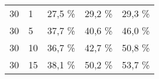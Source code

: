 \begin{table}[!htb]
\begin{tabular}{lllll}
                                                                             &                                                                                        &                                                                                                                       &                                                                                                                        &                                                                                                                        \\ \hline
\multicolumn{1}{|l|}{30}                                                     & \multicolumn{1}{l|}{1}                                                                 & \multicolumn{1}{l|}{27,5 \%}                                                                                           & \multicolumn{1}{l|}{29,2 \%}                                                                                            & \multicolumn{1}{l|}{29,3 \%}                                                                                            \\ \hline
\multicolumn{1}{|l|}{30}                                                     & \multicolumn{1}{l|}{5}                                                                 & \multicolumn{1}{l|}{37,7 \%}                                                                                           & \multicolumn{1}{l|}{40,6 \%}                                                                                            & \multicolumn{1}{l|}{46,0 \%}                                                                                            \\ \hline
\multicolumn{1}{|l|}{30}                                                     & \multicolumn{1}{l|}{10}                                                                & \multicolumn{1}{l|}{36,7 \%}                                                                                           & \multicolumn{1}{l|}{42,7 \%}                                                                                            & \multicolumn{1}{l|}{50,8 \%}                                                                                            \\ \hline
\multicolumn{1}{|l|}{30}                                                     & \multicolumn{1}{l|}{15}                                                                & \multicolumn{1}{l|}{38,1 \%}                                                                                           & \multicolumn{1}{l|}{50,2 \%}                                                                                            & \multicolumn{1}{l|}{53,7 \%}                                                                                            \\ \hline

\end{tabular}
\end{table}
